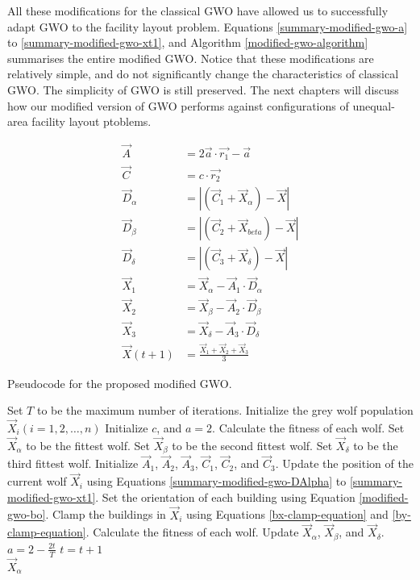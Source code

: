 All these modifications for the classical GWO have allowed us to successfully adapt GWO to the facility layout problem. Equations \ref{summary-modified-gwo-a} to \ref{summary-modified-gwo-xt1}, and Algorithm \ref{modified-gwo-algorithm} summarises the entire modified GWO. Notice that these modifications are relatively simple, and do not significantly change the characteristics of classical GWO. The simplicity of GWO is still preserved. The next chapters will discuss how our modified version of GWO performs against configurations of unequal-area facility layout ptoblems.

\begin{align}
	\vec{A} &= 2\vec{a} \cdot \vec{r_{1}} - \vec{a} \label{summary-modified-gwo-a} \\
	\vec{C} &= c \cdot \vec{r_{2}} \\
	\vec{D}_{\alpha} &= \left | \left ( \vec{C}_{1} + \vec{X}_{\alpha} \right ) - \vec{X} \right | \label{summary-modified-gwo-DAlpha} \\
	\vec{D}_{\beta} &= \left | \left ( \vec{C}_{2} + \vec{X}_{beta} \right ) - \vec{X} \right | \\
	\vec{D}_{\delta} &= \left | \left ( \vec{C}_{3} + \vec{X}_{\delta} \right ) - \vec{X} \right | \\
	\vec{X}_{1} &= \vec{X}_{\alpha} - \vec{A}_{1} \cdot \vec{D}_{\alpha} \\
	\vec{X}_{2} &= \vec{X}_{\beta} - \vec{A}_{2} \cdot \vec{D}_{\beta} \\
	\vec{X}_{3} &= \vec{X}_{\delta} - \vec{A}_{3} \cdot \vec{D}_{\delta} \\
	\vec{X}(t + 1) &= \frac{\vec{X}_{1} + \vec{X}_{2} + \vec{X}_{3}}{3} \label{summary-modified-gwo-xt1}
\end{align}

\begin{algorithm}[h!]
\caption{Pseudocode for the proposed modified GWO.}
\label{modified-gwo-algorithm}
\begin{algorithmic}[1]
\State Set $T$ to be the maximum number of iterations.
\State Initialize the grey wolf population $\vec{X}_{i} (i = 1, 2, \ldots, n)$
\State Initialize $c$, and $a = 2$.
\State Calculate the fitness of each wolf.
\State Set $\vec{X}_{\alpha}$ to be the fittest wolf.
\State Set $\vec{X}_{\beta}$ to be the second fittest wolf.
\State Set $\vec{X}_{\delta}$ to be the third fittest wolf.
		\State Initialize $\vec{A}_{1}$, $\vec{A}_{2}$, $\vec{A}_{3}$, $\vec{C}_{1}$, $\vec{C}_{2}$, and $\vec{C}_{3}$.
		\State Update the position of the current wolf $\vec{X}_{i}$ using Equations \ref{summary-modified-gwo-DAlpha} to \ref{summary-modified-gwo-xt1}.
		\State Set the orientation of each building using Equation \ref{modified-gwo-bo}.
		\State Clamp the buildings in $\vec{X}_{i}$ using Equations \ref{bx-clamp-equation} and \ref{by-clamp-equation}.
	\EndFor
	\State Calculate the fitness of each wolf.
	\State Update $\vec{X}_{\alpha}$, $\vec{X}_{\beta}$, and $\vec{X}_{\delta}$.
	\State $a = 2 - \frac{2t}{T}$
	\State $t = t + 1$
\EndWhile \\
\Return $\vec{X}_{\alpha}$
\end{algorithmic}
\end{algorithm}

